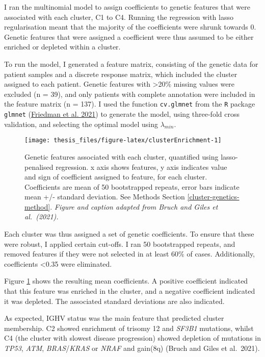 \documentclass[11pt, a4paper, twosided]{book}
\begin{document}
I ran the multinomial model to assign coefficients to genetic features that were associated with each cluster, C1 to C4. Running the regression with lasso regularisation meant that the majority of the coefficients were shrunk towards 0. Genetic features that were assigned a coefficient were thus assumed to be either enriched or depleted within a cluster.

To run the model, I generated a feature matrix, consisting of the genetic data for patient samples and a discrete response matrix, which included the cluster assigned to each patient. Genetic features with \textgreater20\% missing values were excluded (n = 39), and only patients with complete annotation were included in the feature matrix (n = 137). I used the function \texttt{cv.glmnet} from the \texttt{R} package \texttt{glmnet} (\protect\hyperlink{ref-R-glmnet}{Friedman et al. 2021}) to generate the model, using three-fold cross validation, and selecting the optimal model using \(\lambda_{min}\).


\begin{figure}

{\centering \texttt{[image: thesis\_files/figure-latex/clusterEnrichment-1]} 

}

\caption{Genetic features associated with each cluster, quantified using lasso-penalised regression. x axis shows features, y axis indicates value and sign of coefficient assigned to feature, for each cluster. Coefficients are mean of 50 bootstrapped repeats, error bars indicate mean +/- standard deviation. See Methods Section \ref{cluster-genetics-method}. \emph{Figure and caption adapted from Bruch and Giles et al.~(2021).}}\label{fig:clusterEnrichment}
\end{figure}
Each cluster was thus assigned a set of genetic coefficients. To ensure that these were robust, I applied certain cut-offs. I ran 50 bootstrapped repeats, and removed features if they were not selected in at least 60\% of cases. Additionally, coefficients \textless0.35 were eliminated.

Figure \ref{fig:clusterEnrichment} shows the resulting mean coefficients. A positive coefficient indicated that this feature was enriched in the cluster, and a negative coefficient indicated it was depleted. The associated standard deviations are also indicated.

As expected, IGHV status was the main feature that predicted cluster membership. C2 showed enrichment of trisomy 12 and \emph{SF3B1} mutations, whilst C4 (the cluster with slowest disease progression) showed depletion of mutations in \emph{TP53}, \emph{ATM}, \emph{BRAS}/\emph{KRAS} or \emph{NRAF} and gain(8q) (Bruch and Giles et al.~2021).
\end{document}
